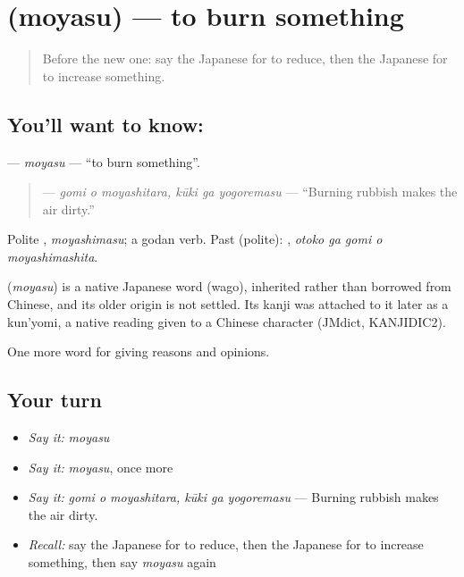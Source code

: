 \section[\texorpdfstring{\ja{もやす} (moyasu)}{もやす (moyasu)}]{ (moyasu) — to burn something}

\label{lesson:JA-C338-moyasu}



\begin{quote}
Before the new one: say the Japanese for to reduce, then the Japanese for to increase something.
\end{quote}

\subsection*{You'll want to know: }
\textbf{} — \emph{moyasu} — \textquotedblleft{}to burn something\textquotedblright{}.

\begin{quote}
\textbf{  } — \emph{gomi o moyashitara, kūki ga yogoremasu} — \textquotedblleft{}Burning rubbish makes the air dirty.\textquotedblright{}
\end{quote}

Polite \textbf{}, \emph{moyashimasu}; a godan verb. Past (polite): \textbf{  }, \emph{otoko ga gomi o moyashimashita}.

\begin{cousinweb}
\textbf{} (\emph{moyasu}) is a native Japanese word (wago), inherited rather than borrowed from Chinese, and its older origin is not settled. Its kanji was attached to it later as a kun'yomi, a native reading given to a Chinese character (JMdict, KANJIDIC2).
\end{cousinweb}

\begin{grammarlens}[title={What you've built}]
One more word for giving reasons and opinions.
\end{grammarlens}

\subsection*{Your turn}
\begin{itemize}
\raggedright
  \item \emph{Say it:} \emph{moyasu}
  \item \emph{Say it:} \emph{moyasu}, once more
  \item \emph{Say it:} \emph{gomi o moyashitara, kūki ga yogoremasu} — Burning rubbish makes the air dirty.
  \item \emph{Recall:} say the Japanese for to reduce, then the Japanese for to increase something, then say \emph{moyasu} again
\end{itemize}

